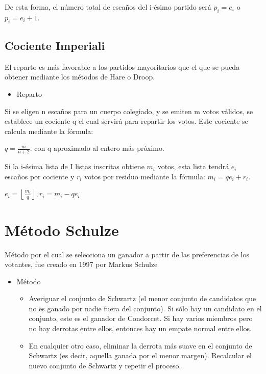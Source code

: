 \documentclass[12pt,a4paper,]{book}
\providecommand{\tightlist}{%
  \setlength{\itemsep}{0pt}\setlength{\parskip}{0pt}}
\numberwithin{dummy}{section}
\theoremstyle{ocrenumbox}
\theoremstyle{blacknumex}
\theoremstyle{blacknumbox}
\theoremstyle{ocrenum}
\theoremstyle{ocrenum}
\begin{document}
De esta forma, el número total de escaños del i-ésimo partido será
\({p_{i}=e_{i}}\) o \({p_{i}=e_{i}+1}\).

\hypertarget{cociente-imperiali}{%
\subsection{Cociente Imperiali}\label{cociente-imperiali}}

El reparto es más favorable a los partidos mayoritarios que el que se
pueda obtener mediante los métodos de Hare o Droop.

\begin{itemize}
\tightlist
\item
  Reparto
\end{itemize}

Si se eligen n escaños para un cuerpo colegiado, y se emiten m votos
válidos, se establece un cociente q el cual servirá para repartir los
votos. Este cociente se calcula mediante la fórmula:

\({q={\frac {m}{n+2}}.}\) con q aproximado al entero más próximo.

Si la i-ésima lista de I listas inscritas obtiene \({m_{i}}\) votos,
esta lista tendrá \({e_{i}}\) escaños por cociente y \({r_{i}}\) votos
por residuo mediante la fórmula: \({m_{i}=qe_{i}+r_{i}}\).

\({e_{i}=\left\lfloor {\frac {m_{i}}{q}}\right\rfloor ,r_{i}=m_{i}-qe_{i}}\)

\hypertarget{muxe9todo-schulze}{%
\section{Método Schulze}\label{muxe9todo-schulze}}

Método por el cual se selecciona un ganador a partir de las preferencias
de los votantes, fue creado en 1997 por Markus Schulze

\begin{itemize}
\item
  Método

  \begin{itemize}
  \tightlist
  \item
    Averiguar el conjunto de Schwartz (el menor conjunto de candidatos
    que no es ganado por nadie fuera del conjunto). Si sólo hay un
    candidato en el conjunto, este es el ganador de Condorcet. Si hay
    varios miembros pero no hay derrotas entre ellos, entonces hay un
    empate normal entre ellos.
  \item
    En cualquier otro caso, eliminar la derrota más suave en el conjunto
    de Schwartz (es decir, aquella ganada por el menor margen).
    Recalcular el nuevo conjunto de Schwartz y repetir el proceso.
  \end{itemize}
\end{itemize}
\end{document}
